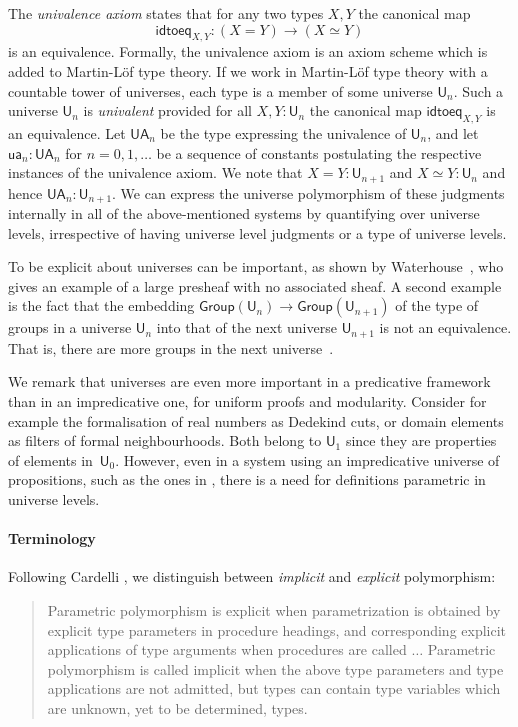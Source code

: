 \documentclass[a4paper,UKenglish,cleveref, autoref, thm-restate]{lipics-v2021}
\newcommand{\UU}{\mathsf{U}}
\newcommand{\Group}{\mathsf{Group}}
\newcommand{\idtoeq}{\mathsf{idtoeq}}
\newcommand{\ua}{\mathsf{ua}}
\newcommand{\UA}{\mathsf{UA}}
\begin{document}
The \emph{univalence axiom} states that for any two types $X,Y$ the canonical map
$$
\idtoeq_{X,Y} : (X=Y)\to (X\simeq Y)
$$
is an equivalence.
Formally, the univalence axiom is an axiom scheme which is added to
Martin-Löf type theory.
If we work in Martin-Löf type theory with a countable tower of universes,
each type is a member of some universe $\UU_n$.
Such a universe $\UU_n$ is {\em univalent} provided for all $X,Y : \UU_n$ the
canonical map $\idtoeq_{X,Y}$ is an equivalence.
Let $\UA_n$ be the type expressing the univalence of $\UU_n$, and let
$\ua_n : \UA_n$ for $n = 0,1,\ldots$ be a sequence of constants postulating
the respective instances of the univalence axiom.
We note that $X = Y : \UU_{n+1}$ and $X\simeq Y : \UU_n$ and
hence $\UA_n : \UU_{n+1}$. We can express the universe polymorphism of these judgments internally in all of the above-mentioned systems by quantifying over universe levels, irrespective of having universe level judgments or a type of universe levels.

To be explicit about universes can be important, as shown by Waterhouse~\cite{waterhouse:sheaves,chambert-loir:universes-matter}, who gives an example of a large presheaf with no associated sheaf. A second example is the fact that the embedding
 $\Group(\UU_n)\rightarrow \Group(\UU_{n+1})$ of the type of groups in a universe $\UU_n$ into that of the next universe $\UU_{n+1}$ is not an equivalence. That is, there are more groups in the next universe~\cite{bcde:largegroup}.

 We remark that universes are even more important in a predicative framework
than in an impredicative one, for uniform proofs and modularity.
Consider for example the formalisation of real numbers as Dedekind cuts,
or domain elements as filters of formal neighbourhoods. Both belong to $\UU_1$ since they are properties of elements in~$\UU_0$.
However, even in a system using an impredicative universe of propositions,
such as the ones in \cite{Huet87,moura:lean}, there is a need for
definitions parametric in universe levels.

\paragraph*{Terminology}
Following Cardelli \cite{Cardelli87}, we distinguish between
{\em implicit} and {\em explicit} polymorphism:
\begin{quotation}
  Parametric polymorphism is explicit when parametrization is obtained by
explicit type parameters in procedure headings, and corresponding explicit
applications of type arguments when procedures are called $\dots$
Parametric polymorphism is called implicit when the above type parameters and type applications are not admitted, but
types can contain type variables which are unknown, yet to be determined, types.
\end{quotation}
\end{document}
